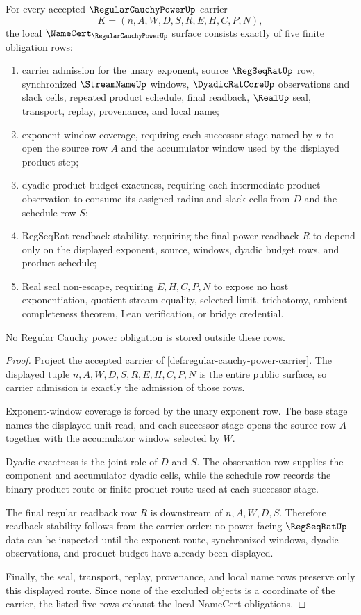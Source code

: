\begin{theorem}\label{thm:regular-cauchy-power-namecert-obligations}
For every accepted $\RegularCauchyPowerUp$ carrier
$$
K=(n,A,W,D,S,R,E,H,C,P,N),
$$
the local $\NameCert_{\RegularCauchyPowerUp}$ surface consists exactly of five finite obligation rows:
\begin{enumerate}
\item carrier admission for the unary exponent, source $\RegSeqRatUp$ row, synchronized $\StreamNameUp$ windows, $\DyadicRatCoreUp$ observations and slack cells, repeated product schedule, final readback, $\RealUp$ seal, transport, replay, provenance, and local name;
\item exponent-window coverage, requiring each successor stage named by $n$ to open the source row $A$ and the accumulator window used by the displayed product step;
\item dyadic product-budget exactness, requiring each intermediate product observation to consume its assigned radius and slack cells from $D$ and the schedule row $S$;
\item RegSeqRat readback stability, requiring the final power readback $R$ to depend only on the displayed exponent, source, windows, dyadic budget rows, and product schedule;
\item Real seal non-escape, requiring $E,H,C,P,N$ to expose no host exponentiation, quotient stream equality, selected limit, trichotomy, ambient completeness theorem, Lean verification, or bridge credential.
\end{enumerate}
No Regular Cauchy power obligation is stored outside these rows.
\end{theorem}
\begin{proof}
Project the accepted carrier of \autoref{def:regular-cauchy-power-carrier}. The displayed tuple $n,A,W,D,S,R,E,H,C,P,N$ is the entire public surface, so carrier admission is exactly the admission of those rows.

Exponent-window coverage is forced by the unary exponent row. The base stage names the displayed unit read, and each successor stage opens the source row $A$ together with the accumulator window selected by $W$.

Dyadic exactness is the joint role of $D$ and $S$. The observation row supplies the component and accumulator dyadic cells, while the schedule row records the binary product route or finite product route used at each successor stage.

The final regular readback row $R$ is downstream of $n,A,W,D,S$. Therefore readback stability follows from the carrier order: no power-facing $\RegSeqRatUp$ data can be inspected until the exponent route, synchronized windows, dyadic observations, and product budget have already been displayed.

Finally, the seal, transport, replay, provenance, and local name rows preserve only this displayed route. Since none of the excluded objects is a coordinate of the carrier, the listed five rows exhaust the local NameCert obligations.
\end{proof}

